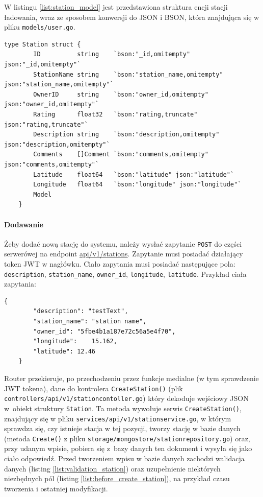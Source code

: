 W listingu \ref{list:station_model} jest przedstawiona struktura encji stacji ładowania, wraz ze sposobem konwersji do JSON i BSON, która znajdująca się w pliku \texttt{models/user.go}.
\begin{lstlisting}[label=list:station_model,caption=Model danych stacji ładowania,basicstyle=\tiny\ttfamily]
    type Station struct {
        ID          string    `bson:"_id,omitempty" json:"_id,omitempty"`
        StationName string    `bson:"station_name,omitempty" json:"station_name,omitempty"`
        OwnerID     string    `bson:"owner_id,omitempty" json:"owner_id,omitempty"`
        Rating      float32   `bson:"rating,truncate" json:"rating,truncate"`
        Description string    `bson:"description,omitempty" json:"description,omitempty"`
        Comments    []Comment `bson:"comments,omitempty" json:"comments,omitempty"`
        Latitude    float64   `bson:"latitude" json:"latitude"`
        Longitude   float64   `bson:"longitude" json:"longitude"`
        Model
    }
\end{lstlisting}

\paragraph{Dodawanie\newline}
Żeby dodać nową stację do systemu, należy wysłać zapytanie \texttt{POST} do części serwerówej na endpoint \url{api/v1/stations}. Zapytanie musi posiadać działający token JWT w nagłówku. Ciało zapytania musi posiadać następujące pola: \texttt{description}, \texttt{station\_name}, \texttt{owner\_id}, \texttt{longitude}, \texttt{latitude}.
Przykład ciała zapytania:
\begin{lstlisting}[basicstyle=\tiny\ttfamily]
    {
		"description": "testText",
		"station_name": "station name",
		"owner_id": "5fbe4b1a187e72c56a5e4f70",
		"longitude":    15.162,
		"latitude": 12.46
    }
\end{lstlisting}

Router przekieruje, po przechodzeniu przez funkcje medialne (w tym sprawdzenie JWT tokena), dane do kontrolera \texttt{CreateStation()} (plik \texttt{controllers/api/v1/stationcontoller.go}) który dekoduje wejściowy JSON w~obiekt struktury \texttt{Station}.
Ta metoda wywołuje serwis \texttt{CreateStation()}, znajdujący się w pliku \texttt{services/api/v1/stationservice.go}, w którym sprawdza się, czy istnieje stacja w tej pozycji, tworzy stację w bazie danych (metoda \texttt{Create()} z pliku \texttt{storage/mongostore/stationrepository.go}) oraz, przy udanym wpisie, pobiera się z~bazy danych ten dokument i wysyła się jako ciało odpowiedź.
Przed tworzeniem wpisu w bazie danych zachodzi walidacja danych (listing \ref{list:validation_station}) oraz uzupełnienie niektórych niezbędnych pól (listing \ref{list:before_create_station}), na przykład czasu tworzenia i ostatniej modyfikacji.

